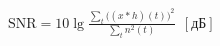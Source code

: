 \documentclass[border=10pt]{standalone}
\begin{document}
$\displaystyle \mathrm{SNR} = 10\lg\frac{\sum_t \bigl((x*h)(t)\bigr)^2}{\sum_t n^2(t)}\ \ [\text{дБ}]$
\end{document}
